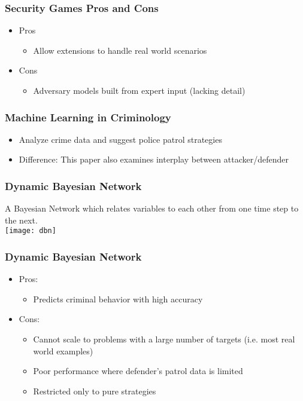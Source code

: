 \documentclass{beamer}
\begin{document}
	\begin{frame}
		\frametitle{Security Games Pros and Cons}
		\begin{itemize}
			\item Pros
			\begin{itemize}
				\item Allow extensions to handle real world scenarios
			\end{itemize}
			\item Cons
			\begin{itemize}
				\item Adversary models built from expert input (lacking detail)
			\end{itemize}
		\end{itemize}
	\end{frame}

	\begin{frame}
		\frametitle{Machine Learning in Criminology}
		\begin{itemize}
			\item Analyze crime data and suggest police patrol strategies
			\item Difference: This paper also examines interplay between attacker/defender
		\end{itemize}
	\end{frame}

	\begin{frame}
		\frametitle{Dynamic Bayesian Network}
		A Bayesian Network which relates variables to each other from one time step to the next.\\
		\texttt{[image: dbn]}
	\end{frame}

	\begin{frame}
		\frametitle{Dynamic Bayesian Network}
		\begin{itemize}
			\item Pros:
			\begin{itemize}
				\item Predicts criminal behavior with high accuracy
			\end{itemize}
			\item Cons:
			\begin{itemize}
				\item Cannot scale to problems with a large number of targets (i.e. most real world examples)
				\item Poor performance where defender's patrol data is limited
				\item Restricted only to pure strategies
			\end{itemize}

		\end{itemize}
	\end{frame}
\end{document}
